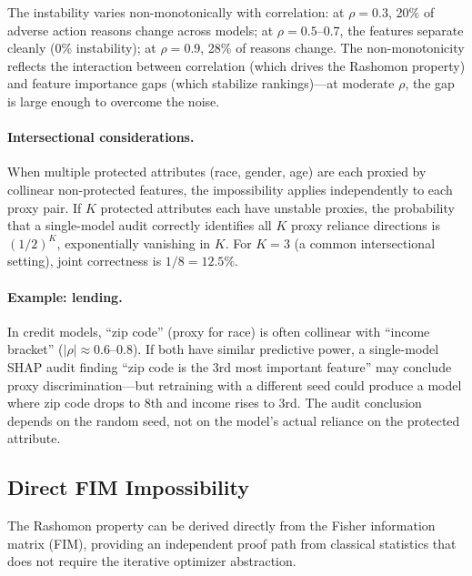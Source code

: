 \documentclass{article}
\begin{document}
The instability varies non-monotonically with correlation: at $\rho = 0.3$, 20\% of adverse action reasons change across models; at $\rho = 0.5$--$0.7$, the features separate cleanly (0\% instability); at $\rho = 0.9$, 28\% of reasons change. The non-monotonicity reflects the interaction between correlation (which drives the Rashomon property) and feature importance gaps (which stabilize rankings)---at moderate $\rho$, the gap is large enough to overcome the noise.

\paragraph{Intersectional considerations.}
When multiple protected attributes (race, gender, age) are each proxied by collinear non-protected features, the impossibility applies independently to each proxy pair. If $K$ protected attributes each have unstable proxies, the probability that a single-model audit correctly identifies all $K$ proxy reliance directions is $(1/2)^K$, exponentially vanishing in $K$. For $K = 3$ (a common intersectional setting), joint correctness is $1/8 = 12.5\%$.

\paragraph{Example: lending.}
In credit models, ``zip code'' (proxy for race) is often collinear with ``income bracket'' ($|\rho| \approx 0.6$--$0.8$). If both have similar predictive power, a single-model SHAP audit finding ``zip code is the 3rd most important feature'' may conclude proxy discrimination---but retraining with a different seed could produce a model where zip code drops to 8th and income rises to 3rd. The audit conclusion depends on the random seed, not on the model's actual reliance on the protected attribute.

\subsection{Direct FIM Impossibility}
\label{sec:fim}

The Rashomon property can be derived directly from the Fisher information matrix (FIM), providing an independent proof path from classical statistics that does not require the iterative optimizer abstraction.
\end{document}
